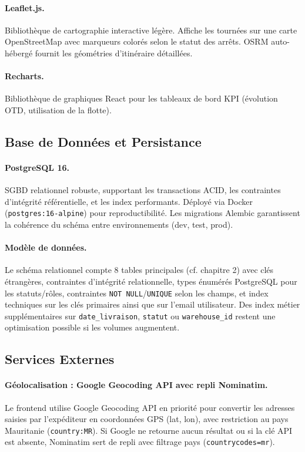 \documentclass[12pt,a4paper]{report}
\begin{document}
\paragraph{Leaflet.js.}
Bibliothèque de cartographie interactive légère. Affiche les tournées sur une carte OpenStreetMap avec marqueurs colorés selon le statut des arrêts. OSRM auto-hébergé fournit les géométries d'itinéraire détaillées.

\paragraph{Recharts.}
Bibliothèque de graphiques React pour les tableaux de bord KPI (évolution OTD, utilisation de la flotte).

\subsection{Base de Données et Persistance}

\paragraph{PostgreSQL 16.}
SGBD relationnel robuste, supportant les transactions ACID, les contraintes d'intégrité référentielle, et les index performants. Déployé via Docker (\texttt{postgres:16-alpine}) pour reproductibilité. Les migrations Alembic garantissent la cohérence du schéma entre environnements (dev, test, prod).

\paragraph{Modèle de données.}
Le schéma relationnel compte 8 tables principales (cf. chapitre 2) avec clés étrangères, contraintes d'intégrité relationnelle, types énumérés PostgreSQL pour les statuts/rôles, contraintes \texttt{NOT NULL}/\texttt{UNIQUE} selon les champs, et index techniques sur les clés primaires ainsi que sur l'email utilisateur. Des index métier supplémentaires sur \texttt{date\_livraison}, \texttt{statut} ou \texttt{warehouse\_id} restent une optimisation possible si les volumes augmentent.

\subsection{Services Externes}

\paragraph{Géolocalisation : Google Geocoding API avec repli Nominatim.}
Le frontend utilise Google Geocoding API \cite{google_geocoding} en priorité pour convertir les adresses saisies par l'expéditeur en coordonnées GPS (lat, lon), avec restriction au pays Mauritanie (\texttt{country:MR}). Si Google ne retourne aucun résultat ou si la clé API est absente, Nominatim sert de repli avec filtrage pays (\texttt{countrycodes=mr}).
\end{document}
